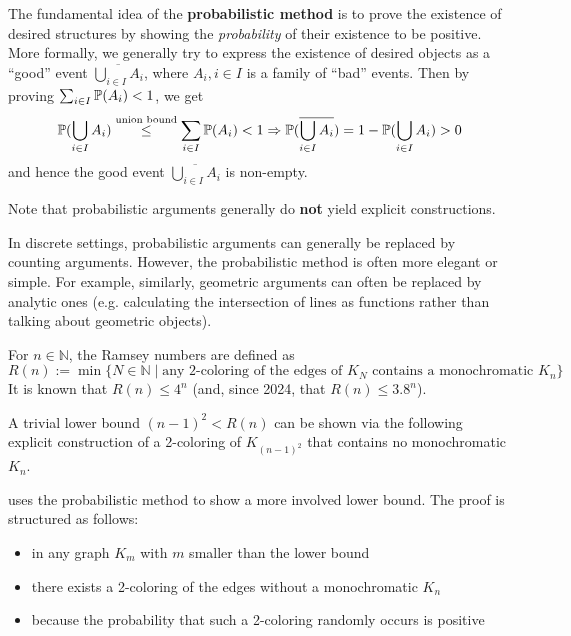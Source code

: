 \documentclass[../main.tex]{subfiles}
\begin{document}
The fundamental idea of the \textbf{probabilistic method} is to prove the existence of desired structures by showing the \textit{probability} of their existence to be positive. More formally, we generally try to express the existence of desired objects as a \enquote{good} event $\overline{\bigcup_{i \in I} A_i}$, where $A_i, i \in I$ is a family of \enquote{bad} events. Then by proving $\sum_{i \in I} \mathbb{P}(A_i) < 1$, we get
\begin{equation}\label{eq:prob}
	\mathbb{P}(\bigcup_{i \in I} A_i) \overset{\text{union bound}}{\leq} \sum_{i \in I} \mathbb{P}(A_i) < 1 \Rightarrow \mathbb{P}(\overline{\bigcup_{i \in I} A_i}) = 1 - \mathbb{P}(\bigcup_{i \in I} A_i) > 0
\end{equation}
and hence the good event $\overline{\bigcup_{i \in I} A_i}$ is non-empty.

\begin{remark}
	Note that probabilistic arguments generally do \textbf{not} yield explicit constructions.
\end{remark}

\begin{remark}
	In discrete settings, probabilistic arguments can generally be replaced by counting arguments. However, the probabilistic method is often more elegant or simple. For example, similarly, geometric arguments can often be replaced by analytic ones (e.g. calculating the intersection of lines as functions rather than talking about geometric objects).
\end{remark}

\begin{example}
	For $n \in \mathbb{N}$, the Ramsey numbers are defined as 
	$$R(n) := \min\{N \in \mathbb{N} \mid \text{any 2-coloring of the edges of } K_N \text{ contains a monochromatic } K_n\}$$
	It is known that $R(n) \leq 4^n$ (and, since 2024, that $R(n) \leq 3.8^n$).
	
	A trivial lower bound $(n-1)^2 < R(n)$ can be shown via the following explicit construction of a 2-coloring of $K_{(n-1)^2}$ that contains no monochromatic $K_n$. 
	
	 uses the probabilistic method to show a more involved lower bound. The proof is structured as follows:
	\bgroup
	\begin{itemize}
		\item in any graph $K_m$ with $m$ smaller than the lower bound
		\item there exists a 2-coloring of the edges without a monochromatic $K_n$
		\item because the probability that such a 2-coloring randomly occurs is positive
	\end{itemize}
	\egroup
\end{example}
\end{document}
